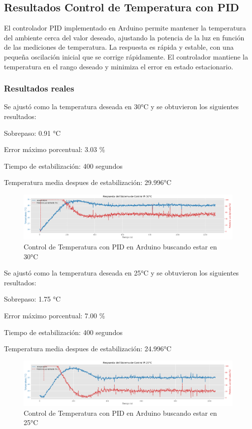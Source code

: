 \documentclass[spanish, a4paper, 11pt]{article}
\begin{document}
\subsection{Resultados Control de Temperatura con PID}

El controlador PID implementado en Arduino permite mantener la temperatura del ambiente cerca del valor deseado, ajustando la potencia de la luz en función de las mediciones de temperatura. La respuesta es rápida y estable, con una pequeña oscilación inicial que se corrige rápidamente. El controlador mantiene la temperatura en el rango deseado y minimiza el error en estado estacionario.

\subsubsection{Resultados reales}

Se ajustó como la temperatura deseada en 30°C y se obtuvieron los siguientes resultados:


Sobrepaso: 0.91 °C

Error máximo porcentual: 3.03 \%

Tiempo de estabilización: 400 segundos

Temperatura media despues de estabilización: 29.996°C

\begin{figure}[ht]
    \centering
    \includegraphics[width=1\textwidth]{PID30.png}
    \caption{Control de Temperatura con PID en Arduino buscando estar en 30°C}
\end{figure}
\FloatBarrier

Se ajustó como la temperatura deseada en 25°C y se obtuvieron los siguientes resultados:


Sobrepaso: 1.75 °C

Error máximo porcentual: 7.00 \%

Tiempo de estabilización: 400 segundos

Temperatura media despues de estabilización: 24.996°C

\begin{figure}[ht]
    \centering
    \includegraphics[width=1\textwidth]{PID25.png}
    \caption{Control de Temperatura con PID en Arduino buscando estar en 25°C}
\end{figure}
\FloatBarrier
\end{document}
